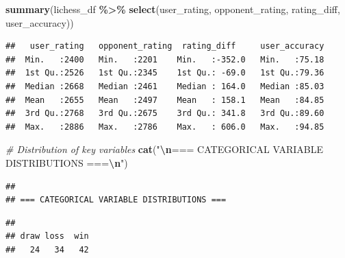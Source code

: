 \documentclass[
]{article}
\newenvironment{Shaded}{\begin{snugshade}}{\end{snugshade}}
\newcommand{\CommentTok}[1]{\textcolor[rgb]{0.56,0.35,0.01}{\textit{#1}}}
\newcommand{\FunctionTok}[1]{\textcolor[rgb]{0.13,0.29,0.53}{\textbf{#1}}}
\newcommand{\NormalTok}[1]{#1}
\newcommand{\SpecialCharTok}[1]{\textcolor[rgb]{0.81,0.36,0.00}{\textbf{#1}}}
\newcommand{\StringTok}[1]{\textcolor[rgb]{0.31,0.60,0.02}{#1}}
\begin{document}
\begin{Shaded}
\begin{Highlighting}[]
\FunctionTok{summary}\NormalTok{(lichess\_df }\SpecialCharTok{\%\textgreater{}\%} \FunctionTok{select}\NormalTok{(user\_rating, opponent\_rating, rating\_diff, user\_accuracy))}
\end{Highlighting}
\end{Shaded}

\begin{verbatim}
##   user_rating   opponent_rating  rating_diff     user_accuracy  
##  Min.   :2400   Min.   :2201    Min.   :-352.0   Min.   :75.18  
##  1st Qu.:2526   1st Qu.:2345    1st Qu.: -69.0   1st Qu.:79.36  
##  Median :2668   Median :2461    Median : 164.0   Median :85.03  
##  Mean   :2655   Mean   :2497    Mean   : 158.1   Mean   :84.85  
##  3rd Qu.:2768   3rd Qu.:2675    3rd Qu.: 341.8   3rd Qu.:89.60  
##  Max.   :2886   Max.   :2786    Max.   : 606.0   Max.   :94.85
\end{verbatim}

\begin{Shaded}
\begin{Highlighting}[]
\CommentTok{\# Distribution of key variables}
\FunctionTok{cat}\NormalTok{(}\StringTok{"}\SpecialCharTok{\textbackslash{}n}\StringTok{=== CATEGORICAL VARIABLE DISTRIBUTIONS ===}\SpecialCharTok{\textbackslash{}n}\StringTok{"}\NormalTok{)}
\end{Highlighting}
\end{Shaded}

\begin{verbatim}
## 
## === CATEGORICAL VARIABLE DISTRIBUTIONS ===
\end{verbatim}

\begin{Shaded}
\end{Shaded}

\begin{verbatim}
## 
## draw loss  win 
##   24   34   42
\end{verbatim}

\begin{Shaded}
\end{Shaded}
\end{document}
